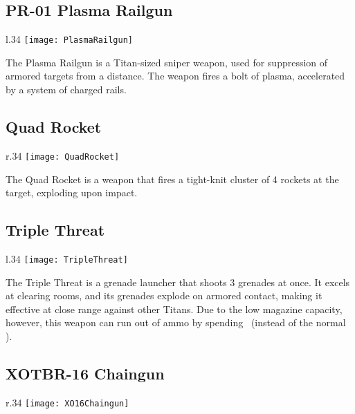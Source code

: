 \subsection{PR-01 Plasma Railgun}
\begin{wrapfigure}[3]{l}{.34\linewidth}
\vspace*{-2em}
\texttt{[image: PlasmaRailgun]}
\end{wrapfigure}

The Plasma Railgun is a Titan-sized sniper weapon, used for suppression of armored targets from a distance. The weapon fires a bolt of plasma, accelerated by a system of charged rails.


\subsection{Quad Rocket}
\begin{wrapfigure}[2]{r}{.34\linewidth}
\vspace*{-2em}
\texttt{[image: QuadRocket]}
\end{wrapfigure}

The Quad Rocket is a weapon that fires a tight-knit cluster of 4 rockets at the target, exploding upon impact.

\subsection{Triple Threat}
\begin{wrapfigure}[4]{l}{.34\linewidth}
\vspace*{-2em}
\texttt{[image: TripleThreat]}
\end{wrapfigure}

The Triple Threat is a grenade launcher that shoots 3 grenades at once. It excels at clearing rooms, and its grenades explode on armored contact, making it effective at close range against other Titans. Due to the low magazine capacity, however, this weapon can run out of ammo by spending \Threat\Threat\Threat\ (instead of the normal \Despair).

\subsection{XOTBR-16 Chaingun}
\begin{wrapfigure}[3]{r}{.34\linewidth}
\vspace*{-2em}
\texttt{[image: XO16Chaingun]}
\end{wrapfigure}

